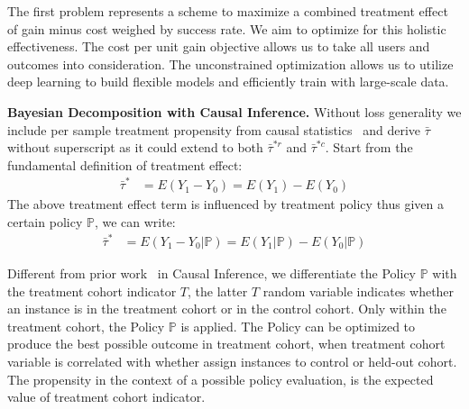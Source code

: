 \documentclass{article}
\begin{document}

The first problem represents a scheme to maximize a combined treatment effect of gain minus cost weighed by success rate. We aim to optimize for this holistic effectiveness. The cost per unit gain objective allows us to take all users and outcomes into consideration. The unconstrained optimization allows us to utilize deep learning to build flexible models and efficiently train with large-scale data. 


\textbf{Bayesian Decomposition with Causal Inference.} Without loss generality we include per sample treatment propensity from causal statistics~\cite{lunceford04stratification} and derive $\bar{\tau}$ without superscript as it could extend to both $\bar{\tau}^{*r}$ and $\bar{\tau}^{*c}$. Start from the fundamental definition of treatment effect: 
\begin{align*} 
\bar{\tau}^{*} &= E(Y_1 - Y_0) = E(Y_1) - E(Y_0) 
\end{align*} 
The above treatment effect term is influenced by treatment policy thus given a certain policy $\mathbb{P}$, we can write: 
\begin{align*} 
\bar{\tau}^{*} &= E(Y_1 - Y_0 | \mathbb{P}) = E(Y_1 | \mathbb{P}) - E(Y_0 | \mathbb{P}) 
\end{align*} 

Different from prior work~\cite{lunceford04stratification} in Causal Inference, we differentiate the Policy $\mathbb{P}$  with the treatment cohort indicator $T$, the latter $T$ random variable indicates whether an instance is in the treatment cohort or in the control cohort. Only within the treatment cohort, the Policy $\mathbb{P}$ is applied. The Policy can be optimized to produce the best possible outcome in treatment cohort, when treatment cohort variable is correlated with whether assign instances to control or held-out cohort. The propensity in the context of a possible policy evaluation, is the expected value of treatment cohort indicator. 
\end{document}
